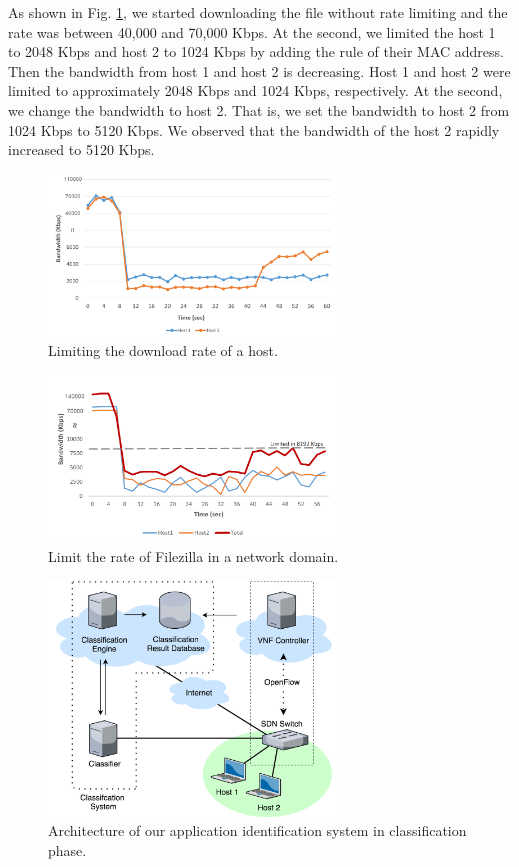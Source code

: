 \documentclass[conference]{IEEEtran}
\begin{document}
As shown in Fig. \ref{fig:qos_limit_host}, we started downloading the file without rate limiting and the rate was between 40,000 and 70,000 Kbps.
At the  second, we limited the host 1 to 2048 Kbps and host 2 to 1024 Kbps by adding the rule of their MAC address.
Then the bandwidth from host 1 and host 2 is decreasing. Host 1 and host 2 were limited to approximately 2048 Kbps and 1024 Kbps, respectively.
At the  second, we change the bandwidth to host 2. That is, we set the bandwidth to host 2 from 1024 Kbps to 5120 Kbps.
We observed that the bandwidth of the host 2 rapidly increased to 5120 Kbps.

\begin{figure}[!t]
\centering
\includegraphics[width=3in]{./figures/qos_limit_host}
\caption{Limiting the download rate of a host.}
\label{fig:qos_limit_host}
\end{figure}

\begin{figure}[!t]
\centering
\includegraphics[width=3in]{./figures/mft_qos_rate_domain_app}
\caption{Limit the rate of Filezilla in a network domain.}
\label{fig:mft_qos_rate_domain_app}
\end{figure}

\begin{figure}[!t]
\centering
\includegraphics[width=3in]{./figures/classification_classifying}
\caption{Architecture of our application identification system in classification phase.}
\label{fig:class_classifying}
\end{figure}
\end{document}
